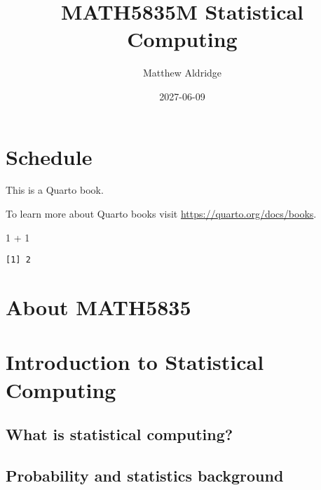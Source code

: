 \documentclass[
  letterpaper,
  DIV=11,
  numbers=noendperiod]{scrreprt}
\title{MATH5835M Statistical Computing}
\author{Matthew Aldridge}
\date{2027-06-09}
\newenvironment{Shaded}{\begin{snugshade}}{\end{snugshade}}
\newcommand{\DecValTok}[1]{\textcolor[rgb]{0.68,0.00,0.00}{#1}}
\newcommand{\SpecialCharTok}[1]{\textcolor[rgb]{0.37,0.37,0.37}{#1}}
\renewcommand*\contentsname{Table of contents}
\newcommand\contentsname{Table of contents}
\theoremstyle{definition}
\theoremstyle{definition}
\theoremstyle{remark}
\begin{document}
\maketitle

\renewcommand*\contentsname{Table of contents}
{
\hypersetup{linkcolor=}
\setcounter{tocdepth}{2}
\tableofcontents
}

\chapter*{Schedule}\label{schedule}


This is a Quarto book.

To learn more about Quarto books visit
\url{https://quarto.org/docs/books}.

\begin{Shaded}
\begin{Highlighting}[]
\DecValTok{1} \SpecialCharTok{+} \DecValTok{1}
\end{Highlighting}
\end{Shaded}

\begin{verbatim}
[1] 2
\end{verbatim}


\chapter*{About MATH5835}\label{about-math5835}



\chapter{Introduction to Statistical
Computing}\label{introduction-to-statistical-computing}

\section{What is statistical
computing?}\label{what-is-statistical-computing}

\section{Probability and statistics
background}\label{probability-and-statistics-background}
\end{document}

